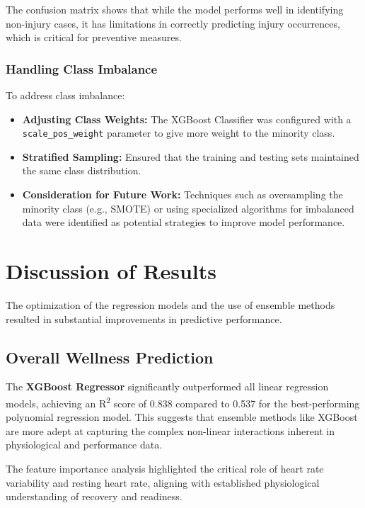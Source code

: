 \documentclass[manuscript,acmsmall,review,screen,authorversion=true]{acmart}
\begin{document}
The confusion matrix shows that while the model performs well in identifying non-injury cases, it has limitations in correctly predicting injury occurrences, which is critical for preventive measures.

\subsubsection{Handling Class Imbalance}

To address class imbalance:

\begin{itemize}
    \item \textbf{Adjusting Class Weights:} The XGBoost Classifier was configured with a \texttt{scale\_pos\_weight} parameter to give more weight to the minority class.

    \item \textbf{Stratified Sampling:} Ensured that the training and testing sets maintained the same class distribution.

    \item \textbf{Consideration for Future Work:} Techniques such as oversampling the minority class (e.g., SMOTE) or using specialized algorithms for imbalanced data were identified as potential strategies to improve model performance.
\end{itemize}

\section{Discussion of Results}

The optimization of the regression models and the use of ensemble methods resulted in substantial improvements in predictive performance.

\subsection{Overall Wellness Prediction}

The \textbf{XGBoost Regressor} significantly outperformed all linear regression models, achieving an R\textsuperscript{2} score of 0.838 compared to 0.537 for the best-performing polynomial regression model. This suggests that ensemble methods like XGBoost are more adept at capturing the complex non-linear interactions inherent in physiological and performance data.

The feature importance analysis highlighted the critical role of heart rate variability and resting heart rate, aligning with established physiological understanding of recovery and readiness.
\end{document}

